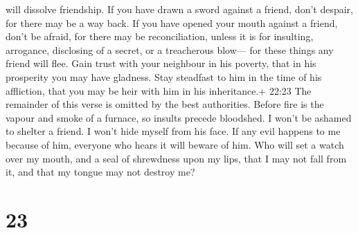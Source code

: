 will dissolve friendship.  If you have drawn a sword
against a friend, don't despair, for there may be a way back.
 If you have opened your mouth against a friend, don't be
afraid, for there may be reconciliation, unless it is for insulting,
arrogance, disclosing of a secret, or a treacherous blow--- for these
things any friend will flee.  Gain trust with your
neighbour in his poverty, that in his prosperity you may have gladness.
Stay steadfast to him in the time of his affliction, that you may be
heir with him in his inheritance.+ 22:23 The remainder of this verse is
omitted by the best authorities.  Before fire is the vapour
and smoke of a furnace, so insults precede bloodshed.  I
won't be ashamed to shelter a friend. I won't hide myself from his face.
 If any evil happens to me because of him, everyone who
hears it will beware of him.  Who will set a watch over my
mouth, and a seal of shrewdness upon my lips, that I may not fall from
it, and that my tongue may not destroy me?

\hypertarget{section-19}{%
\section{23}\label{section-19}}

